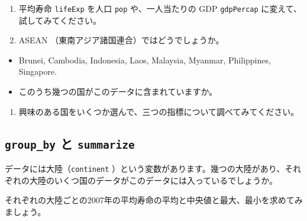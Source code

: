 \documentclass[
  xelatex, ja=standard]{bxjsbook}
\providecommand{\tightlist}{%
  \setlength{\itemsep}{0pt}\setlength{\parskip}{0pt}}
\theoremstyle{definition}
\theoremstyle{definition}
\theoremstyle{definition}
\theoremstyle{definition}
\theoremstyle{remark}
\begin{document}
\begin{enumerate}
\def\labelenumi{\arabic{enumi}.}
\tightlist
\item
  平均寿命 \texttt{lifeExp} を人口 \texttt{pop} や、一人当たりの GDP \texttt{gdpPercap} に変えて、試してみてください。
\item
  ASEAN （東南アジア諸国連合）ではどうでしょうか。
\end{enumerate}

\begin{itemize}
\item
  Brunei, Cambodia, Indonesia, Laos, Malaysia, Myanmar, Philippines, Singapore.
\item
  このうち幾つの国がこのデータに含まれていますか。
\end{itemize}

\begin{enumerate}
\def\labelenumi{\arabic{enumi}.}
\setcounter{enumi}{2}
\tightlist
\item
  興味のある国をいくつか選んで、三つの指標について調べてみてください。
\end{enumerate}

\hypertarget{group_by-ux3068-summarize}{%
\subsection{\texorpdfstring{\texttt{group\_by} と \texttt{summarize}}{group\_by と summarize}}\label{group_by-ux3068-summarize}}

データには大陸（\texttt{continent} ）という変数があります。幾つの大陸があり、それぞれの大陸のいくつ国のデータがこのデータには入っているでしょうか。

それぞれの大陸ごとの2007年の平均寿命の平均と中央値と最大、最小を求めてみましょう。
\end{document}
